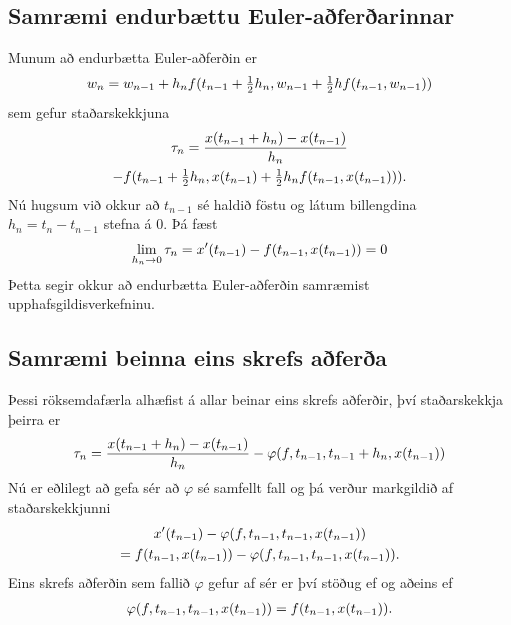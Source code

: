 \documentclass[letterpaper,10pt,icelandic]{sphinxmanual}
\begin{document}
\subsection{Samræmi endurbættu Euler-aðferðarinnar}
\label{kafli06:samraemi-endurbaettu-euler-aferarinnar}
Munum að endurbætta Euler-aðferðin er
\begin{gather}
\begin{split}w_n=w_{n-1}+h_nf(t_{n-1}+\tfrac 12 h_n,w_{n-1}+\tfrac 12 hf(t_{n-1},w_{n-1}))\end{split}\notag
\end{gather}
sem gefur staðarskekkjuna
\begin{gather}
\begin{split}\begin{gathered}
\tau_n=\dfrac{x(t_{n-1}+h_n)-x(t_{n-1})}{h_n}\\
-f(t_{n-1}+\tfrac 12 h_n,x(t_{n-1})+\tfrac 12 h_nf(t_{n-1},x(t_{n-1}))).
  \end{gathered}\end{split}\notag
\end{gather}
Nú hugsum við okkur að \(t_{n-1}\) sé haldið föstu og látum
billengdina \(h_n=t_n-t_{n-1}\) stefna á \(0\). Þá fæst
\begin{gather}
\begin{split}\lim_{h_n\to 0} \tau_n= x'(t_{n-1})-f(t_{n-1},x(t_{n-1}))=0\end{split}\notag
\end{gather}
Þetta segir okkur að endurbætta Euler-aðferðin samræmist
upphafsgildisverkefninu.


\subsection{Samræmi beinna eins skrefs aðferða}
\label{kafli06:samraemi-beinna-eins-skrefs-afera}
Þessi röksemdafærla alhæfist á allar beinar eins skrefs aðferðir, því
staðarskekkja þeirra er
\begin{gather}
\begin{split}\tau_n=\dfrac{x(t_{n-1}+h_n)-x(t_{n-1})}{h_n}
-\varphi(f,t_{n-1},t_{n-1}+h_n,x(t_{n-1}))\end{split}\notag
\end{gather}
Nú er eðlilegt að gefa sér að \(\varphi\) sé samfellt fall og þá
verður markgildið af staðarskekkjunni
\begin{gather}
\begin{split}\begin{gathered}
x'(t_{n-1})-\varphi(f,t_{n-1},t_{n-1},x(t_{n-1}))\\
=f(t_{n-1},x(t_{n-1}))-\varphi(f,t_{n-1},t_{n-1},x(t_{n-1})).\end{gathered}\end{split}\notag
\end{gather}
Eins skrefs aðferðin sem fallið \(\varphi\) gefur af sér er því
stöðug ef og aðeins ef
\begin{gather}
\begin{split}\varphi(f,t_{n-1},t_{n-1},x(t_{n-1}))
=f(t_{n-1},x(t_{n-1})).\end{split}\notag
\end{gather}
\end{document}
